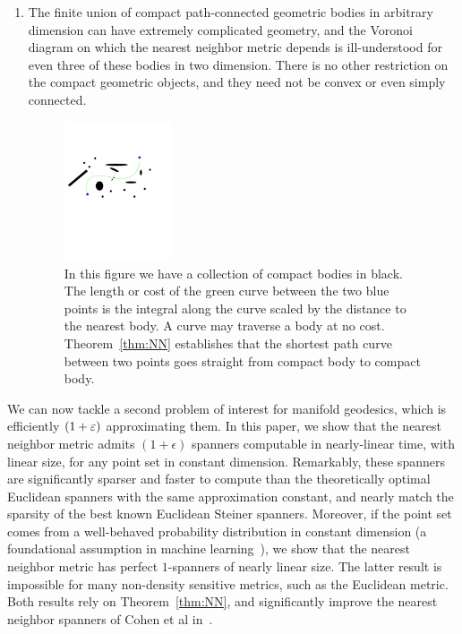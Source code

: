 \begin{enumerate}
 \item The finite union of compact path-connected geometric bodies in arbitrary
 dimension can have extremely complicated geometry, and the Voronoi diagram
on which the nearest neighbor metric depends is ill-understood for even
three of these bodies in two dimension.  There is no other restriction on
the compact geometric objects, and they need not be convex or even simply
connected. 
\begin{figure}[htbp]
  \centering
    \includegraphics[width=0.3\textwidth]{Figures/example1.pdf}
    \caption{In this figure we have a collection of compact bodies in black.
      The length or cost of the green curve between the two blue points
      is the integral along the curve scaled by the distance to the nearest body.
    A curve may traverse a body at  no cost. Theorem~\ref{thm:NN}
establishes that the shortest path curve between two points goes straight
from compact body to compact body.}
  \label{fig:example1}
\end{figure}




\end{enumerate}

We can now tackle a second problem of interest for manifold geodesics,
which is efficiently $(1+\varepsilon)$ approximating them. In this paper, we show
that the nearest neighbor metric admits $(1+\epsilon)$ spanners computable
in nearly-linear time, with linear size, for any point set in constant
dimension. Remarkably, these spanners are significantly sparser and faster
to compute than the theoretically optimal Euclidean spanners with the same
approximation constant, and nearly match the sparsity of the best known
Euclidean Steiner spanners. Moreover, if the point set comes from a
well-behaved probability distribution in constant dimension (a foundational
assumption in machine learning~\cite{hwang2016}), we show that the nearest neighbor
metric has perfect $1$-spanners of nearly linear size. The latter result is
impossible for many non-density sensitive metrics, such as the Euclidean
metric. Both results rely on Theorem~\ref{thm:NN}, and significantly
improve the nearest neighbor spanners of Cohen et al in~\cite{cohen15approximating}.

